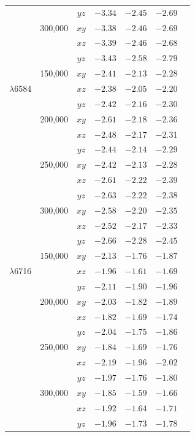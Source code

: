 \documentclass[useAMS,usenatbib]{mn2e}
\begin{document}
\begin{table}
\begin{tabular}{ccccccc}
                  &                &$yz$& $-3.34$ & $-2.45$ & $-2.69$ \\
                  & 300,000  &$xy$& $-3.38$ & $-2.46$ & $-2.69$ \\
                  &                &$xz$& $-3.39$ & $-2.46$ & $-2.68$ \\
                  &                &$yz$& $-3.43$ & $-2.58$ & $-2.79$ \\
\hline
\nii{}           & 150,000  &$xy$& $-2.41$ & $-2.13$ & $-2.28$ \\
$\lambda$6584 &        &$xz$& $-2.38$ & $-2.05$ & $-2.20$ \\
                  &                &$yz$& $-2.42$ & $-2.16$ & $-2.30$ \\
                 & 200,000 &$xy$& $-2.61$ & $-2.18$ & $-2.36$ \\
                  &                &$xz$& $-2.48$ & $-2.17$ & $-2.31$ \\
                  &                &$yz$& $-2.44$ & $-2.14$ & $-2.29$ \\
                 & 250,000 &$xy$& $-2.42$ & $-2.13$ & $-2.28$ \\
                  &                &$xz$& $-2.61$ & $-2.22$ & $-2.39$ \\
                  &                &$yz$& $-2.63$ & $-2.22$ & $-2.38$ \\
                 & 300,000 &$xy$& $-2.58$ & $-2.20$ & $-2.35$ \\
                  &                &$xz$& $-2.52$ & $-2.17$ & $-2.33$ \\
                  &                &$yz$& $-2.66$ & $-2.28$ & $-2.45$ \\
\hline
\sii{}           & 150,000  &$xy$& $-2.13$ & $-1.76$ & $-1.87$ \\
$\lambda$6716 &        &$xz$& $-1.96$ & $-1.61$ & $-1.69$ \\
                  &                &$yz$& $-2.11$ & $-1.90$ & $-1.96$ \\
                  & 200,000  &$xy$& $-2.03$ & $-1.82$ & $-1.89$ \\
                  &                &$xz$& $-1.82$ & $-1.69$ & $-1.74$ \\
                  &                &$yz$& $-2.04$ & $-1.75$ & $-1.86$ \\
                 & 250,000  &$xy$& $-1.84$ & $-1.69$ &  $-1.76$ \\
                  &                &$xz$& $-2.19$ & $-1.96$ & $-2.02$ \\
                  &                &$yz$& $-1.97$ & $-1.76$ & $-1.80$ \\
                 & 300,000  &$xy$& $-1.85$ & $-1.59$ & $-1.66$ \\
                  &                &$xz$& $-1.92$ & $-1.64$ & $-1.71$ \\
                  &                &$yz$& $-1.96$ & $-1.73$ & $-1.78$ \\
\hline
\end{tabular}
\end{table}
\end{document}

